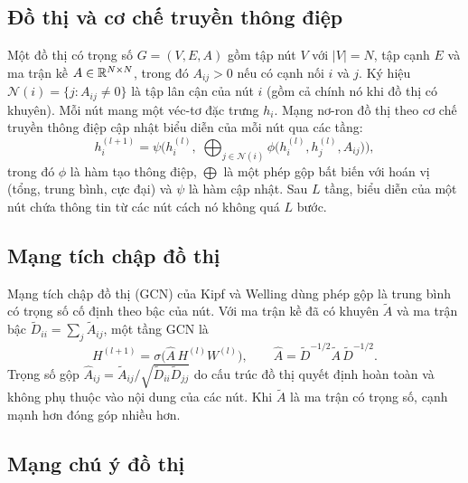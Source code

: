 \subsection{Đồ thị và cơ chế truyền thông điệp}

Một đồ thị có trọng số $G=(V,E,A)$ gồm tập nút $V$ với $|V|=N$, tập cạnh $E$ và ma trận kề $A\in\mathbb{R}^{N\times N}$, trong đó $A_{ij}>0$ nếu có cạnh nối $i$ và $j$. Ký hiệu $\mathcal{N}(i)=\{j: A_{ij}\ne 0\}$ là tập lân cận của nút $i$ (gồm cả chính nó khi đồ thị có khuyên). Mỗi nút mang một véc-tơ đặc trưng $h_i$. Mạng nơ-ron đồ thị theo cơ chế truyền thông điệp \cite{gilmer2017} cập nhật biểu diễn của mỗi nút qua các tầng:
\begin{equation}
h_i^{(l+1)}=\psi\Big(h_i^{(l)},\;\bigoplus_{j\in\mathcal{N}(i)}\phi\big(h_i^{(l)},h_j^{(l)},A_{ij}\big)\Big),
\label{eq:mpnn}
\end{equation}
trong đó $\phi$ là hàm tạo thông điệp, $\bigoplus$ là một phép gộp bất biến với hoán vị (tổng, trung bình, cực đại) và $\psi$ là hàm cập nhật. Sau $L$ tầng, biểu diễn của một nút chứa thông tin từ các nút cách nó không quá $L$ bước.

\subsection{Mạng tích chập đồ thị}

Mạng tích chập đồ thị (GCN) của Kipf và Welling \cite{kipf2017} dùng phép gộp là trung bình có trọng số cố định theo bậc của nút. Với ma trận kề đã có khuyên $\tilde A$ và ma trận bậc $\tilde D_{ii}=\sum_j\tilde A_{ij}$, một tầng GCN là
\begin{equation}
H^{(l+1)}=\sigma\big(\hat A\,H^{(l)}W^{(l)}\big),\qquad \hat A=\tilde D^{-1/2}\tilde A\,\tilde D^{-1/2}.
\label{eq:gcn}
\end{equation}
Trọng số gộp $\hat A_{ij}=\tilde A_{ij}/\sqrt{\tilde D_{ii}\tilde D_{jj}}$ do cấu trúc đồ thị quyết định hoàn toàn và không phụ thuộc vào nội dung của các nút. Khi $\tilde A$ là ma trận có trọng số, cạnh mạnh hơn đóng góp nhiều hơn.

\subsection{Mạng chú ý đồ thị}

